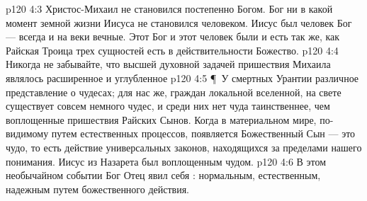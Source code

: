 \vs p120 4:3 Христос\hyp{}Михаил не становился постепенно Богом. Бог ни в какой момент земной жизни Иисуса не становился человеком. Иисус был человек  Бог --- всегда и на веки вечные. Этот Бог и этот человек были и есть  так же, как Райская Троица трех сущностей есть в действительности  Божество.
\vs p120 4:4 Никогда не забывайте, что высшей духовной задачей пришествия Михаила являлось расширенное и углубленное 
\vs p120 4:5 \P\ У смертных Урантии различное представление о чудесах; для нас же, граждан локальной вселенной, на свете существует совсем немного чудес, и среди них нет чуда таинственнее, чем воплощенные пришествия Райских Сынов. Когда в материальном мире, по\hyp{}видимому путем естественных процессов, появляется Божественный Сын --- это чудо, то есть действие универсальных законов, находящихся за пределами нашего понимания. Иисус из Назарета был воплощенным чудом.
\vs p120 4:6 В этом необычайном событии Бог Отец явил себя : нормальным, естественным, надежным путем божественного действия.

